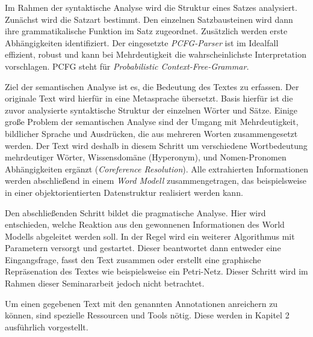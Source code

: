 \par
Im Rahmen der syntaktische Analyse wird die Struktur eines Satzes analysiert. Zunächst wird die Satzart bestimmt. Den einzelnen Satzbausteinen wird dann ihre grammatikalische Funktion im Satz zugeordnet. Zusätzlich werden erste Abhängigkeiten identifiziert. Der eingesetzte \textit{PCFG-Parser} ist im Idealfall effizient, robust und kann bei Mehrdeutigkeit die wahrscheinlichste Interpretation vorschlagen. PCFG steht für \textit{Probabilistic Context-Free-Grammar.}
\par
Ziel der semantischen Analyse ist es, die Bedeutung des Textes zu erfassen. Der originale Text wird hierfür in eine Metasprache übersetzt. Basis hierfür ist die zuvor analysierte syntaktische Struktur der einzelnen Wörter und Sätze. Einige große Problem der semantischen Analyse sind der Umgang mit Mehrdeutigkeit, bildlicher Sprache und Ausdrücken, die aus mehreren Worten zusammengesetzt werden. Der Text wird deshalb in diesem Schritt um verschiedene Wortbedeutung mehrdeutiger Wörter, Wissensdomäne (Hyperonym), und Nomen-Pronomen Abhängigkeiten ergänzt (\textit{Coreference Resolution}). Alle extrahierten Informationen werden abschließend in einem \textit{Word Modell} zusammengetragen, das beispielsweise in einer objektorientierten Datenstruktur realisiert werden kann.

\par
Den abschließenden Schritt bildet die pragmatische Analyse. Hier wird entschieden, welche Reaktion aus den gewonnenen Informationen des World Modells abgeleitet werden soll. In der Regel wird ein weiterer Algorithmus mit Parametern versorgt und gestartet. Dieser beantwortet dann entweder eine Eingangsfrage, fasst den Text zusammen oder erstellt eine graphische Repräsenation des Textes wie beispielsweise ein Petri-Netz. Dieser Schritt wird im Rahmen dieser Seminararbeit jedoch nicht betrachtet.

Um einen gegebenen Text mit den genannten Annotationen anreichern zu können, sind spezielle Ressourcen und Tools nötig. Diese werden in Kapitel 2 ausführlich vorgestellt.







